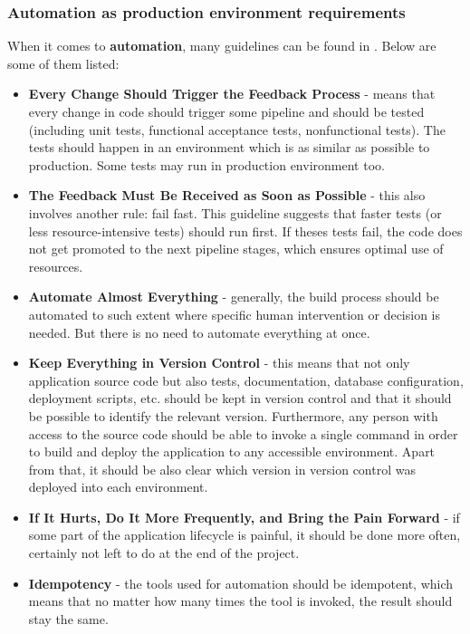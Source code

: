 \subsubsection{Automation as production environment requirements}
When it comes to \textbf{automation}, many guidelines can be found in \cite{book-cicd}. Below are some of them listed:
\begin{itemize}
\item \textbf{Every Change Should Trigger the Feedback Process} - means that every change in code should trigger some pipeline and should be tested (including unit tests, functional acceptance tests, nonfunctional tests). The tests should happen in an environment which is as similar as possible to production. Some tests may run in production environment too\cite{book-cicd}\cite{book-iac}.
\item \textbf{The Feedback Must Be Received as Soon as Possible} - this also involves another rule: fail fast. This guideline suggests that faster tests (or less resource-intensive tests) should run first. If theses tests fail, the code does not get promoted to the next pipeline stages, which ensures optimal use of resources\cite{book-cicd}.
\item \textbf{Automate Almost Everything} - generally, the build process should be automated to such extent where specific human intervention or decision is needed. But there is no need to automate everything at once\cite{book-cicd}\cite{book-iac}.
\item \textbf{Keep Everything in Version Control} - this means that not only application source code but also tests, documentation, database configuration, deployment scripts, etc. should be kept in version control and that it should be possible to identify the relevant version. Furthermore, any person with access to the source code should be able to invoke a single command in order to build and deploy the application to any accessible environment. Apart from that, it should be also clear which version in version control was deployed into each environment\cite{book-cicd}.
\item \textbf{If It Hurts, Do It More Frequently, and Bring the Pain Forward} - if some part of the application lifecycle is painful, it should be done more often, certainly not left to do at the end of the project\cite{book-cicd}.
\item \textbf{Idempotency} - the tools used for automation should be idempotent, which means that no matter how many times the tool is invoked, the result should stay the same\cite{book-iac}.
\end{itemize}

